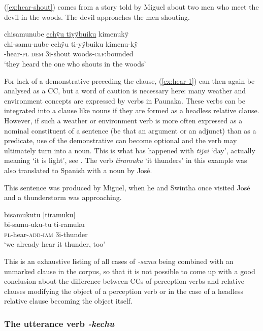 (\ref{ex:hear-shout}) comes from a story told by Miguel about two men who meet the devil in the woods. The devil approaches the men shouting.

\ea\label{ex:hear-shout}
\begingl
\glpreamble chisamunube \underline{echÿu tiyÿbuiku} kimenukÿ\\
\gla chi-samu-nube echÿu ti-yÿbuiku kimenu-kÿ\\
-hear-\textsc{pl} \textsc{dem} 3i-shout woods-\textsc{clf:}bounded\\
\glft ‘they heard the one who shouts in the woods’
\endgl
\trailingcitation{[mxx-n101017s-1.020]}
\xe
{}

For lack of a demonstrative preceding the clause, (\ref{ex:hear-1}) can then again be analysed as a CC, but a word of caution is necessary here: many weather and environment concepts are expressed by verbs in Paunaka. These verbs can be integrated into a clause like nouns if they are formed as a headless relative clause. However, if such a weather or environment verb is more often expressed as a nominal constituent of a sentence (be that an argument or an adjunct) than as a predicate, use of the demonstrative can become optional and the verb may ultimately turn into a noun. This is what has happened with \textit{tijai} ‘day’, actually meaning ‘it is light’, see . The verb \textit{tiramuku} ‘it thunders’ in this example was also translated to Spanish with a noun by José.

This sentence was produced by Miguel, when he and Swintha once visited José and a thunderstorm was approaching. 

\ea\label{ex:hear-1}
\begingl
\glpreamble bisamukutu \textup{[}tiramuku\textup{]}\\
\gla bi-samu-uku-tu ti-ramuku\\
\textsc{pl}-hear-\textsc{add}-\textsc{iam} 3i-thunder\\
\glft ‘we already hear it thunder, too’
\endgl
\trailingcitation{[mox-c110926s-1.176]}
\xe{}

This is an exhaustive listing of all cases of \textit{-samu} being combined with an unmarked clause in the corpus, so that it is not possible to come up with a good conclusion about the difference between CCs of perception verbs and relative clauses modifying the object of a perception verb or in the case of a headless relative clause becoming the object itself.

\subsubsection{The utterance verb \textit{-kechu}}\label{sec:CC_Utterance}

